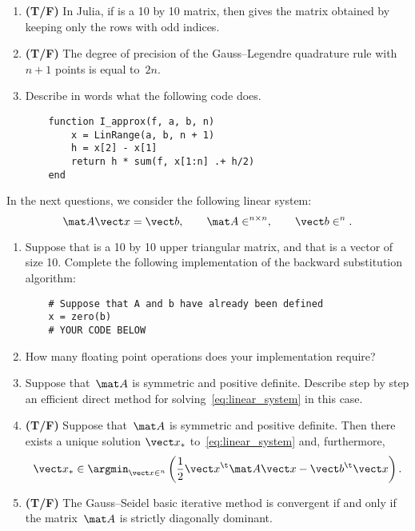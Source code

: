 \documentclass{article}
\begin{document}
\begin{enumerate}
    \item
        \textbf{(T/F)}
        In Julia, if  is a 10 by 10 matrix,
        then  gives the matrix obtained by keeping only the rows with odd indices.

    \item
        \textbf{(T/F)}
        The degree of precision of the Gauss--Legendre quadrature rule with $n + 1$ points is equal to~$2n$.

    \item
        Describe in words what the following code does.
        \begin{verbatim}
    function I_approx(f, a, b, n)
        x = LinRange(a, b, n + 1)
        h = x[2] - x[1]
        return h * sum(f, x[1:n] .+ h/2)
    end
        \end{verbatim}
        \vspace{2.5cm}
\end{enumerate}

\newpage
In the next questions,
we consider the following linear system:
\begin{equation}
    \label{eq:linear_system}
    \mat A \vect x = \vect b,
    \qquad \mat A \in \real^{n \times n},
    \qquad \vect b \in \real^n.
\end{equation}
\begin{enumerate}
    \item
        Suppose that  is a 10 by 10 upper triangular matrix,
        and that  is a vector of size 10.
        Complete the following implementation of the backward substitution algorithm:
\begin{verbatim}
    # Suppose that A and b have already been defined
    x = zero(b)
    # YOUR CODE BELOW
\end{verbatim}
    \vspace{2cm}

    \item
        How many floating point operations does your implementation require?

    \item
        Suppose that~$\mat A$ is symmetric and positive definite.
        Describe step by step an efficient direct method for solving~\eqref{eq:linear_system} in this case.
        \vspace{2cm}


    \item 
        \textbf{(T/F)}
        Suppose that~$\mat A$ is symmetric and positive definite.
        Then there exists a unique solution $\vect x_*$ to~\eqref{eq:linear_system}
        and, furthermore,
        \[
            \vect x_* \in \argmin_{\vect x \in \real^n} \left( \frac{1}{2} \vect x^\t \mat A \vect x - \vect b^\t \vect x \right).
        \]

    \item
        \textbf{(T/F)}
        The Gauss--Seidel basic iterative method is convergent if and only if the matrix~$\mat A$ is strictly diagonally dominant.
\end{enumerate}
\end{document}
